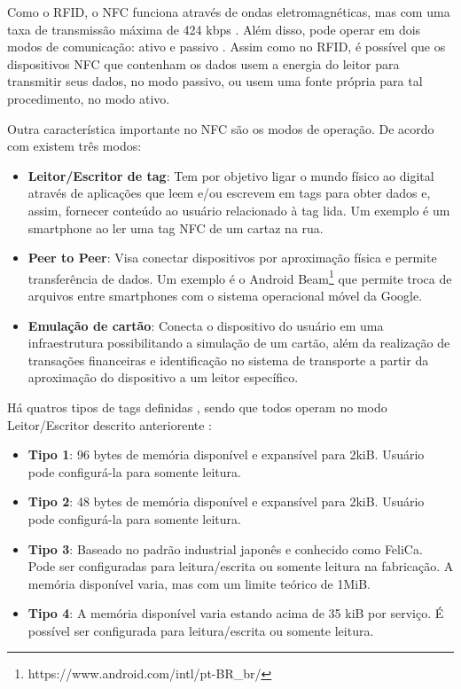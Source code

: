 Como o RFID, o NFC funciona através de ondas eletromagnéticas, mas com uma taxa de transmissão máxima de 424 kbps \cite{NFCForum2016}. Além disso, pode operar em dois modos de comunicação: ativo e passivo  \cite{Igoe2014}. Assim como no RFID, é possível que os dispositivos NFC que contenham os dados usem a energia do leitor para transmitir seus dados, no modo passivo, ou usem uma fonte própria para tal procedimento, no modo ativo.


Outra característica importante no NFC são os modos de operação. De acordo com  existem três modos:

\begin{itemize} \parskip -1pt
	\item \textbf{Leitor/Escritor de tag}: Tem por objetivo ligar o mundo físico ao digital através 
	de aplicações que leem e/ou escrevem em tags para obter dados e, assim, fornecer conteúdo ao 
	usuário relacionado à tag lida. Um exemplo é um smartphone ao ler uma tag NFC de um cartaz na 
	rua.
	\item \textbf{Peer to Peer}: Visa conectar dispositivos por aproximação física e permite transferência de dados. Um exemplo é o Android Beam\textsuperscript{\textregistered}\footnote{https://www.android.com/intl/pt-BR\_br/} que permite troca de arquivos entre smartphones com o 
	sistema operacional móvel da Google.
	\item \textbf{Emulação de cartão}: Conecta o dispositivo do usuário em uma infraestrutura 
	possibilitando a simulação de um cartão, além da realização de transações financeiras e 
	identificação no sistema de transporte a partir da aproximação do dispositivo a um leitor 
	específico.
\end{itemize}

Há quatros tipos de tags definidas \cite{NFCForum2016a}, sendo que todos operam no modo Leitor/Escritor descrito anteriorente : 

\begin{itemize} \parskip -1pt
	\item \textbf{Tipo 1}: 96 bytes de memória disponível e expansível para 2kiB. Usuário pode 
	configurá-la para somente leitura.
	\item \textbf{Tipo 2}: 48 bytes de memória disponível e expansível para 2kiB. Usuário pode 
	configurá-la para somente leitura.
	\item \textbf{Tipo 3}: Baseado no padrão industrial japonês e conhecido como FeliCa. Pode ser 
	configuradas para leitura/escrita ou somente leitura na fabricação. A memória disponível varia, 
	mas com um limite teórico de 1MiB.
	\item \textbf{Tipo 4}: A memória disponível varia estando acima de 35 kiB por serviço. É 
	possível ser configurada para leitura/escrita ou somente leitura.
\end{itemize}

